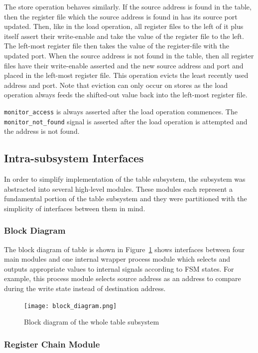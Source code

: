 \documentclass{article}
\begin{document}
The store operation behaves similarly. If the source address is found in the table, then the register file which the source address is found in has its source port updated. Then, like in the load operation, all register files to the left of it plus itself assert their write-enable and take the value of the register file to the left. The left-most register file then takes the value of the register-file with the updated port. When the source address is not found in the table, then all register files have their write-enable asserted and the new source address and port and placed in the left-most register file. This operation evicts the least recently used address and port. Note that eviction can only occur on stores as the load operation always feeds the shifted-out value back into the left-most register file.

\texttt{monitor\_access} is always asserted after the load operation commences. The \texttt{monitor\_not\_found} signal is asserted after the load operation is attempted and the address is not found.

\subsection{Intra-subsystem Interfaces}

In order to simplify implementation of the table subsystem, the subsystem was abstracted into several high-level modules. These modules each represent a fundamental portion of the table subsystem and they were partitioned with the simplicity of interfaces between them in mind. 

\newpage
\subsubsection{Block Diagram}
The block diagram of table is shown in Figure~\ref{fig:block_diagram} shows interfaces between four main modules and one internal wrapper process module which selects and outputs appropriate values to internal signals according to FSM states. For example, this process module selects source address as an address to compare during the write state instead of destination address. 
\begin{figure}[ht!]
  \centering
  	\texttt{[image: block\_diagram.png]}
  \caption{Block diagram of the whole table subsystem}
  \label{fig:block_diagram}
\end{figure}


\subsubsection{Register Chain Module}
\end{document}
